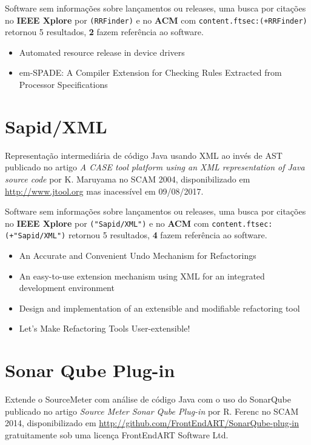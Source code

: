 Software sem informações sobre lançamentos ou releases,
uma busca por citações no {\bf IEEE Xplore} por
\texttt{(RRFinder)}
e no {\bf ACM} com
\texttt{content.ftsec:(+RRFinder)}
retornou
5 resultados,
{\bf 2} fazem referência ao software.

\begin{itemize}
\item Automated resource release in device drivers
\item em-SPADE: A Compiler Extension for Checking Rules Extracted from Processor Specifications
\end{itemize}


\section{Sapid/XML}

Representação intermediária de código Java usando XML ao invés de AST
publicado no artigo {\it A CASE tool platform using an XML representation of Java source code}
por K. Maruyama
no SCAM 2004,
disponibilizado em \url{http://www.jtool.org}
mas inacessível em 09/08/2017.

Software sem informações sobre lançamentos ou releases,
uma busca por citações no {\bf IEEE Xplore} por
\texttt{("Sapid/XML")}
e no {\bf ACM} com
\texttt{content.ftsec:(+"Sapid/XML")}
retornou
5 resultados,
{\bf 4} fazem referência ao software.

\begin{itemize}
\item An Accurate and Convenient Undo Mechanism for Refactorings
\item An easy-to-use extension mechanism using XML for an integrated development environment
\item Design and implementation of an extensible and modifiable refactoring tool
\item Let's Make Refactoring Tools User-extensible!
\end{itemize}


\section{Sonar Qube Plug-in}

Extende o SourceMeter com análise de código Java com o uso do SonarQube
publicado no artigo {\it Source Meter Sonar Qube Plug-in}
por R. Ferenc
no SCAM 2014,
disponibilizado em \url{http://github.com/FrontEndART/SonarQube-plug-in}
gratuitamente
sob uma licença FrontEndART Software Ltd.

